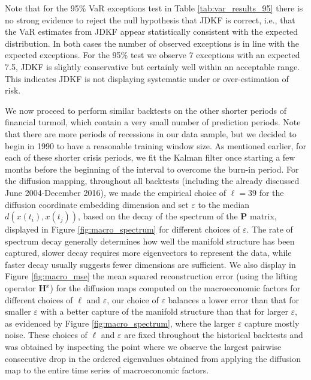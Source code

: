 \documentclass[11pt]{article}
\theoremstyle{plain}
\theoremstyle{definition}
\theoremstyle{remark}
\numberwithin{equation}{section}
\newcommand{\veps}{\varepsilon}
\begin{document}
Note that for the 95\% VaR exceptions test in Table \ref{tab:var_results_95} there is no strong evidence to reject the null hypothesis that JDKF is correct, i.e., that the VaR estimates from JDKF appear statistically consistent with the expected distribution. In both cases the number of observed exceptions is in line with the expected exceptions. For the 95\% test we observe 7 exceptions with an expected 7.5, JDKF is slightly conservative but certainly well within an acceptable range. This indicates JDKF is not displaying systematic under or over-estimation of risk. 

We now proceed to perform similar backtests on the other shorter periods of financial turmoil, which contain a very small number of prediction periods. Note that there are more periods of recessions in our data sample, but we decided to begin in 1990 to have a reasonable training window size. As mentioned earlier, for each of these shorter crisis periods, we fit the Kalman filter once starting a few months before the beginning of the interval to overcome the burn-in period. For the diffusion mapping, throughout all backtests (including the already discussed June 2004-December 2016), we made the empirical choice of $\ell=39$ for the diffusion coordinate embedding dimension and set $\veps$ to the median $d(x(t_i),x(t_j))$, based on the decay of the spectrum of the $\mathbf{P}$ matrix, displayed in Figure \ref{fig:macro_spectrum} for different choices of $\veps$. The rate of spectrum decay generally determines how well the manifold structure has been captured, slower decay requires more eigenvectors to represent the data, while faster decay usually suggests fewer dimensions are sufficient. We also display in Figure \ref{fig:macro_mse} the mean squared reconstruction error (using the lifting operator $\mathbf{H}^x$) for the diffusion maps computed on the macroeconomic factors for different choices of $\ell$ and $\veps$, our choice of $\veps$ balances a lower error than that for smaller $\veps$ with a better capture of the manifold structure than that for larger $\veps$, as evidenced by Figure \ref{fig:macro_spectrum}, where the larger $\veps$ capture mostly noise. These choices of $\ell$ and $\veps$ are fixed throughout the historical backtests and was obtained by inspecting the point where we observe the largest pairwise consecutive drop in the ordered eigenvalues obtained from applying the diffusion map to the entire time series of macroeconomic factors. 
\end{document}
